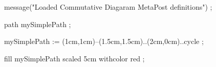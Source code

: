 
\startchapter[title=Conclusions]

\startMpIVCode



message("Loaded Commutative Diagaram MetaPost definitions") ;

path mySimplePath ;

mySimplePath := (1cm,1cm)--(1.5cm,1.5cm)..(2cm,0cm)..cycle ;

\stopMpIVCode

\startMPpage
fill mySimplePath scaled 5cm withcolor red ;
\stopMPpage

\stopchapter